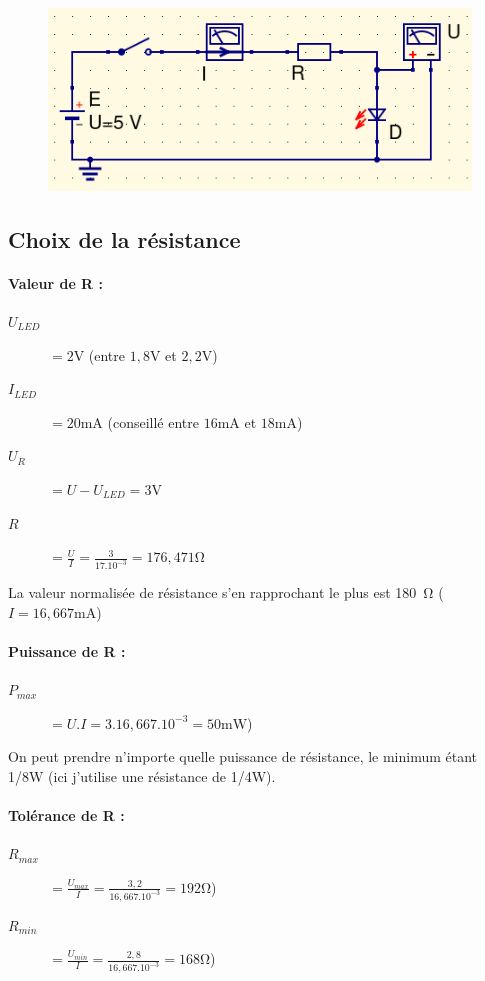 \documentclass{article}
\begin{document}
\begin{figure}[H]
    \centering
    \includegraphics[width=.6\linewidth]{images/labo1.png}
\end{figure}

\subsection{Choix de la résistance}
\paragraph{Valeur de R :}
\begin{description}
    \item[$U_{LED}$] $= 2\si{\volt}$ (entre $1,8\si{\volt}$ et $2,2\si{\volt}$)
    \item[$I_{LED}$] $= 20\si{\milli\ampere}$ (conseillé entre $16\si{\milli\ampere}$ et $18\si{\milli\ampere}$)
    \item[$U_R$] $= U - U_{LED} = 3\si{\volt}$
    \item[$R$] $= \frac{U}{I} = \frac{3}{17.10^{-3}} = 176,471\si{\ohm}$
\end{description}
La valeur normalisée de résistance s'en rapprochant le plus est \SI{180}{\ohm} ($I = 16,667\si{\milli\ampere}$)

\paragraph{Puissance de R :}
\begin{description}
    \item[$P_{max}$] $= U.I = 3.16,667.10^{-3} = 50 \si{\milli\watt}$)
\end{description}
On peut prendre n'importe quelle puissance de résistance, le minimum étant 1/8\si{\watt} (ici j'utilise une résistance de 1/4\si{\watt}).

\paragraph{Tolérance de R :}
\begin{description}
    \item[$R_{max}$] $= \frac{U_{max}}{I} = \frac{3,2}{16,667.10^{-3}} = 192 \si{\ohm}$)
    \item[$R_{min}$] $= \frac{U_{min}}{I} = \frac{2,8}{16,667.10^{-3}} = 168 \si{\ohm}$)
\end{description}
\end{document}
